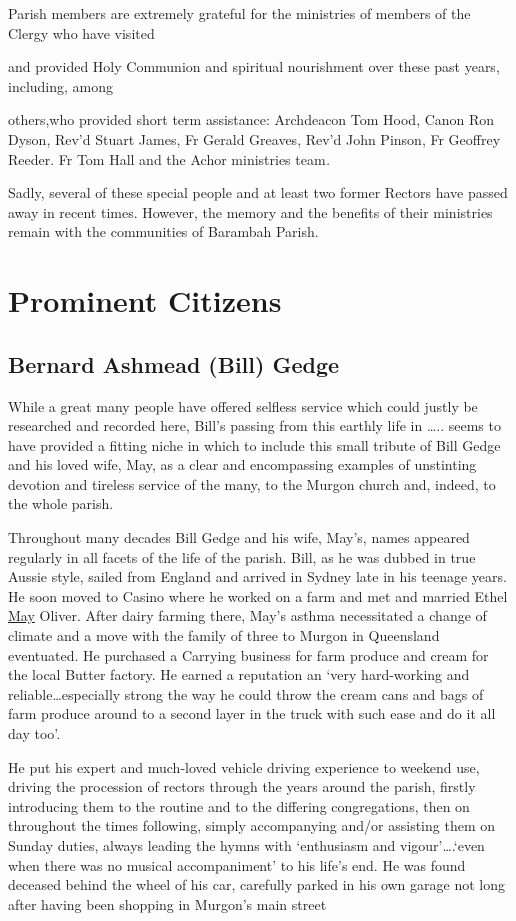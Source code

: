 Parish members are extremely grateful for the ministries of members of
the Clergy who have visited

and provided Holy Communion and spiritual nourishment over these past
years, including, among

others,who provided short term assistance: Archdeacon Tom Hood, Canon
Ron Dyson, Rev'd Stuart James, Fr Gerald Greaves, Rev'd John Pinson, Fr
Geoffrey Reeder. Fr Tom Hall and the Achor ministries team\emph{.}

Sadly, several of these special people and at least two former Rectors
have passed away in recent times. However, the memory and the benefits
of their ministries remain with the communities of Barambah Parish.

\chapter{Prominent Citizens}

\section{Bernard Ashmead (Bill)
Gedge}

While a great many people have offered selfless service which could
justly be researched and recorded here, Bill's passing from this earthly
life in \ldots.. seems to have provided a fitting niche in which to
include this small tribute of Bill Gedge and his loved wife, May, as a
clear and encompassing examples of unstinting devotion and tireless
service of the many, to the Murgon church and, indeed, to the whole
parish.

Throughout many decades Bill Gedge and his wife, May's, names appeared
regularly in all facets of the life of the parish. Bill, as he was
dubbed in true Aussie style, sailed from England and arrived in Sydney
late in his teenage years. He soon moved to Casino where he worked on a
farm and met and married Ethel \underline{May} Oliver. After dairy
farming there, May's asthma necessitated a change of climate and a move
with the family of three to Murgon in Queensland eventuated. He
purchased a Carrying business for farm produce and cream for the local
Butter factory. He earned a reputation an `very hard-working and
reliable\ldots especially strong the way he could throw the cream cans
and bags of farm produce around to a second layer in the truck with such
ease and do it all day too'.

He put his expert and much-loved vehicle driving experience to weekend
use, driving the procession of rectors through the years around the
parish, firstly introducing them to the routine and to the differing
congregations, then on throughout the times following, simply
accompanying and/or assisting them on Sunday duties, always leading the
hymns with `enthusiasm and vigour'\ldots.`even when there was no musical
accompaniment' to his life's end. He was found deceased behind the wheel
of his car, carefully parked in his own garage not long after having
been shopping in Murgon's main street

